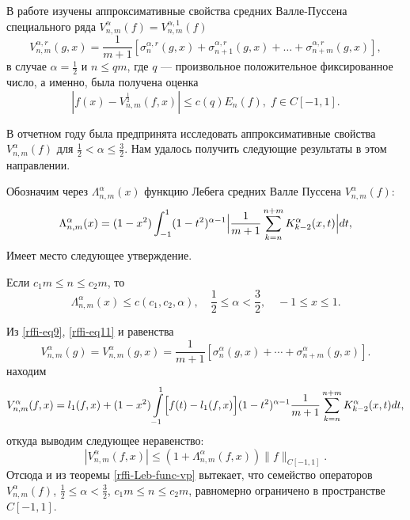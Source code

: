 В работе \cite{rffi-15} изучены аппроксимативные свойства средних Валле-Пуссена специального ряда $V_{n,m}^\alpha(f)=V_{n,m}^{\alpha,1}(f)$
\begin{equation}\label{rffi-vp-r}
	V_{n,m}^{\alpha, r}(g, x) = \frac{1}{m+1} \left[ \sigma_n^{\alpha, r}(g, x) + \sigma_{n+1}^{\alpha, r}(g, x) + \ldots + \sigma_{n+m}^{\alpha, r}(g, x) \right],
\end{equation}
в случае $\alpha=\frac{1}{2}$ и $n \le qm$, где $q$ --- произвольное положительное фиксированное число, а именно, была получена оценка
\begin{equation}\label{rffi-est-Vp05}
|f(x)-V_{n,m}^\frac{1}{2}(f,x)| \le c(q) E_n(f), \; f \in C[-1,1].
\end{equation}

В отчетном году была предпринята  исследовать аппроксимативные свойства $V_{n,m}^\alpha(f)$ для $\frac{1}{2} < \alpha \le \frac{3}{2}$. Нам удалось получить следующие результаты в этом направлении.

Обозначим через $\Lambda_{n,m}^\alpha(x)$ функцию Лебега средних Валле Пуссена $V_{n,m}^\alpha(f)$:
\begin{equation*}
\Lambda_{n,m}^\alpha(x)=
(1-x^2)\int_{-1}^{1}(1-t^2)^{\alpha-1}\Bigl|
\frac{1}{m+1}\sum\limits_{k=n}^{n+m}K^\alpha_{k-2}(x,t)
\Bigr|dt,
\end{equation*}
Имеет место следующее утверждение.
\begin{theorem}\label{rffi-Leb-func-vp}
Если $c_1 m \le n \le c_2 m$, то
\begin{equation}
  \Lambda_{n,m}^\alpha(x)\le c(c_1, c_2, \alpha), \quad \frac12 \le \alpha < \frac32, \quad -1 \le x \le 1.
\end{equation}
\end{theorem}

Из \eqref{rffi-eq9}, \eqref{rffi-eq11} и равенства
\begin{equation*}%
V_{n,m}^\alpha(g)=V_{n,m}^\alpha(g,x)=\frac{1}{m+1}[\sigma_n^\alpha(g,x)+\cdots+\sigma_{n+m}^\alpha(g,x)].
\end{equation*}
находим
\begin{equation*}
V_{n,m}^\alpha(f,x)=
l_1(f,x)+(1-x^2)\int\limits_{-1}^{1}
\Bigl[
f(t)-l_1(f,x)
\Bigr]
(1-t^2)^{\alpha-1}\frac{1}{m+1}\sum\limits_{k=n}^{n+m}K_{k-2}^\alpha(x,t)dt,
\end{equation*}
откуда выводим следующее неравенство:
\begin{equation*}
|V_{n,m}^\alpha(f,x)| \le (1+\Lambda_{n,m}^\alpha(f,x))\|f\|_{C[-1,1]}.
\end{equation*}
Отсюда и из теоремы \ref{rffi-Leb-func-vp} вытекает, что семейство операторов $V_{n,m}^\alpha(f)$, $\frac12\le \alpha < \frac32$, $c_1m \le n\le c_2m$, равномерно ограничено в пространстве $C[-1,1]$.

